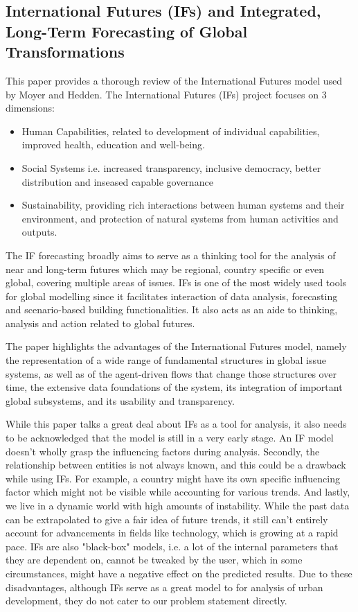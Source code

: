 \documentclass[conference]{IEEEtran}
\begin{document}
\subsection{International Futures (IFs) and Integrated, Long-Term Forecasting of Global Transformations}\label{if}

This paper \cite{ifmodel} provides a thorough review of the International Futures model used by Moyer and Hedden\cite{SDG}. 
The International Futures (IFs) project focuses on 3 dimensions:

\begin{itemize}
    \item{Human Capabilities, related to development of individual capabilities, improved health, education and well-being.}
    \item{Social Systems i.e. increased transparency, inclusive democracy, better distribution and inseased capable governance}
    \item Sustainability, providing rich interactions between human systems and their environment, and protection of natural systems from human activities and outputs.
\end{itemize}

The IF forecasting broadly aims to serve as a thinking tool for the analysis of near and long-term futures which may be regional, country specific or even global, covering multiple areas of issues. IFs is one of the most widely used tools for global modelling since it facilitates interaction of data analysis, forecasting and scenario-based building functionalities. It also acts as an aide to thinking, analysis and action related to global futures.

The paper highlights the advantages of the International Futures model, namely the representation of a wide range of fundamental structures in global issue systems, as well as of the agent-driven flows that change those structures over time, the extensive data foundations of the system, its integration of important global subsystems, and its usability and transparency.

While this paper talks a great deal about IFs as a tool for analysis, it also needs to be acknowledged that the model is still in a very early stage. An IF model doesn’t wholly grasp the influencing factors during analysis. Secondly, the relationship between entities is not always known, and this could be a drawback while using IFs. For example, a country might have its own specific influencing factor which might not be visible while accounting for various trends. And lastly, we live in a dynamic world with high amounts of instability. While the past data can be extrapolated to give a fair idea of future trends, it still can’t entirely account for advancements in fields like technology, which is growing at a rapid pace. IFs are also "black-box" models, i.e. a lot of the internal parameters that they are dependent on, cannot be tweaked by the user, which in some circumstances, might have a negative effect on the predicted results. Due to these disadvantages, although IFs serve as a great model to for analysis of urban development, they do not cater to our problem statement directly.
\end{document}
